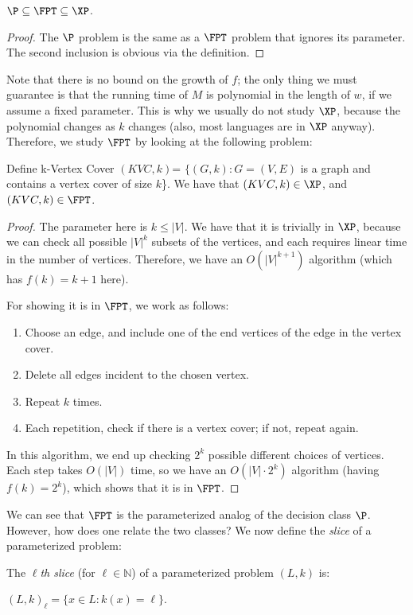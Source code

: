 \begin{theorem}
$\P \subseteq \FPT \subseteq \XP$.
\end{theorem}

\begin{proof}
The $\P$ problem is the same as a $\FPT$ problem that ignores its parameter. The second inclusion is obvious via the definition.
\end{proof}

Note that there is no bound on the growth of $f$; the only thing we must guarantee is that the running time of $M$ is polynomial in the length of $w$, if we assume a fixed parameter. This is why we usually do not study $\XP$, because the polynomial changes as $k$ changes (also, most languages are in $\XP$ anyway). Therefore, we study $\FPT$ by looking at the following problem:

\begin{theorem}
Define k-Vertex Cover $(KVC, k)$= $\{(G, k) : G = (V, E)$ is a graph and contains a vertex cover of size $k$\}. We have that $(KVC, k) \in \XP$, and $(KVC, k) \in \FPT$.
\end{theorem}

\begin{proof}
\par The parameter here is $k \le |V|$. We have that it is trivially in $\XP$, because we can check all possible $|V|^k$ subsets of the vertices, and each requires linear time in the number of vertices. Therefore, we have an $O(|V|^{k+1})$ algorithm (which has $f(k) = k+1$ here).

\par For showing it is in $\FPT$, we work as follows:
\begin{enumerate}
\item Choose an edge, and include one of the end vertices of the edge in the vertex cover. 
\item Delete all edges incident to the chosen vertex.
\item Repeat $k$ times.
\item Each repetition, check if there is a vertex cover; if not, repeat again. 
\end{enumerate}

In this algorithm, we end up checking $2^k$ possible different choices of vertices. Each step takes $O(|V|)$ time, so we have an $O(|V| \cdot 2^k)$ algorithm (having $f(k) = 2^k$), which shows that it is in $\FPT$.
\end{proof}

We can see that $\FPT$ is the parameterized analog of the decision class $\P$. However, how does one relate the two classes? We now define the \emph{slice} of a parameterized problem:
\begin{definition}
The \emph{$\ell$th slice} (for $\ell \in \mathbb{N}$) of a parameterized problem $(L, k)$ is:
\begin{center}
$(L, k)_{\ell} = \{x \in L : k(x) = \ell\}$.
\end{center}
\end{definition}

